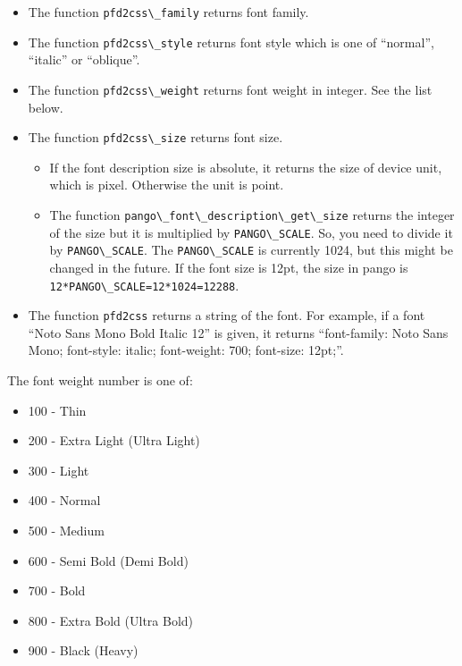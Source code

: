 \begin{itemize}
\tightlist
\item
  The function \passthrough{\lstinline!pfd2css\_family!} returns font
  family.
\item
  The function \passthrough{\lstinline!pfd2css\_style!} returns font
  style which is one of ``normal'', ``italic'' or ``oblique''.
\item
  The function \passthrough{\lstinline!pfd2css\_weight!} returns font
  weight in integer. See the list below.
\item
  The function \passthrough{\lstinline!pfd2css\_size!} returns font
  size.

  \begin{itemize}
  \tightlist
  \item
    If the font description size is absolute, it returns the size of
    device unit, which is pixel. Otherwise the unit is point.
  \item
    The function
    \passthrough{\lstinline!pango\_font\_description\_get\_size!}
    returns the integer of the size but it is multiplied by
    \passthrough{\lstinline!PANGO\_SCALE!}. So, you need to divide it by
    \passthrough{\lstinline!PANGO\_SCALE!}. The
    \passthrough{\lstinline!PANGO\_SCALE!} is currently 1024, but this
    might be changed in the future. If the font size is 12pt, the size
    in pango is \passthrough{\lstinline!12*PANGO\_SCALE=12*1024=12288!}.
  \end{itemize}
\item
  The function \passthrough{\lstinline!pfd2css!} returns a string of the
  font. For example, if a font ``Noto Sans Mono Bold Italic 12'' is
  given, it returns ``font-family: Noto Sans Mono; font-style: italic;
  font-weight: 700; font-size: 12pt;''.
\end{itemize}

The font weight number is one of:

\begin{itemize}
\tightlist
\item
  100 - Thin
\item
  200 - Extra Light (Ultra Light)
\item
  300 - Light
\item
  400 - Normal
\item
  500 - Medium
\item
  600 - Semi Bold (Demi Bold)
\item
  700 - Bold
\item
  800 - Extra Bold (Ultra Bold)
\item
  900 - Black (Heavy)
\end{itemize}

